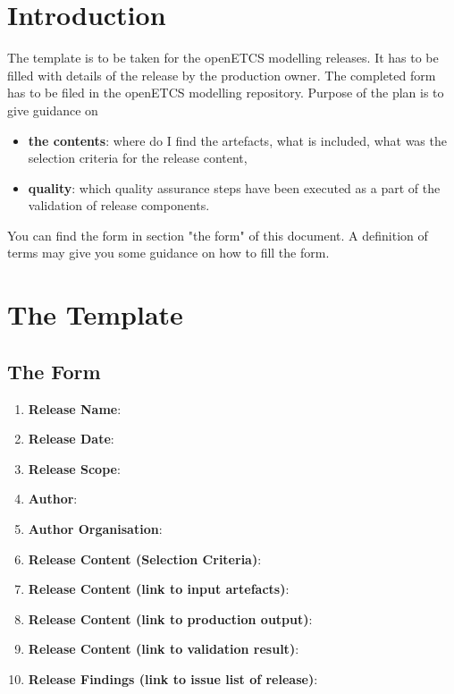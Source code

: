 \documentclass{template/openetcs_article}
\begin{document}
\tableofcontents
\listoffiguresandtables
\newpage





\section{Introduction}
The template is to be taken for the openETCS modelling releases. It has to be filled with details of the release by the production owner. The completed form has to be filed in the openETCS modelling repository. Purpose of the plan is to give guidance on\\
\begin{itemize}
\item \textbf{the contents}: where do I find the artefacts, what is included, what was the selection criteria for the release content,
\item \textbf{quality}: which quality assurance steps have been executed as a part of the validation of release components.
\end{itemize}

You can find the form in section "the form" of this document. A definition of terms may give you some guidance on how to fill the form. 

\newpage

\section{The Template}

\subsection{The Form}
\begin{enumerate}
\item \textbf{Release Name}:
\item \textbf{Release Date}:
\item \textbf{Release Scope}:
\item \textbf{Author}:
\item \textbf{Author Organisation}:
\item \textbf{Release Content (Selection Criteria)}:
\item \textbf{Release Content (link to input artefacts)}:
\item \textbf{Release Content (link to production output)}:
\item \textbf{Release Content (link to validation result)}:
\item \textbf{Release Findings (link to issue list of release)}:
\end{enumerate}
\end{document}
